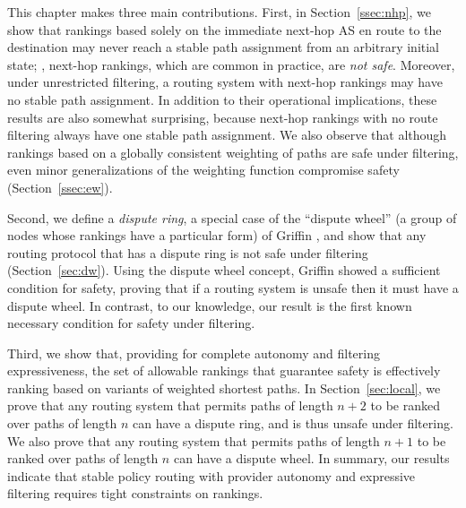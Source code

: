 

This chapter makes three main contributions.  First, in
Section~\ref{ssec:nhp}, we show that rankings based solely on the
immediate next-hop AS en route to the destination may never reach a
stable path assignment from an arbitrary initial state; \ie, next-hop
rankings, which are common in practice, are {\em not safe}.  Moreover,
under unrestricted filtering, a routing system with next-hop rankings
may have no stable path assignment.  In addition to their operational
implications, these results are also somewhat surprising, because
next-hop rankings with no route filtering always have one stable path
assignment.  We also observe that although rankings
based on a globally consistent weighting of paths are safe under
filtering, even minor generalizations of the weighting function
compromise safety (Section~\ref{ssec:ew}).

Second, we define a {\em dispute ring}, a special case of the
``dispute wheel'' (a group of nodes whose rankings have a particular
form) of Griffin
\ea\cite{Griffin2002c}, and show that any routing protocol that has
a dispute ring is not safe under filtering (Section~\ref{sec:dw}).
Using the dispute wheel concept, Griffin \ea showed a sufficient
condition for safety, proving that if a routing system is unsafe then
it must have a dispute wheel.  In contrast, to our knowledge, our
result is the first known necessary condition for safety under
filtering.

Third, we show that, providing for complete autonomy and filtering
expressiveness, the set of allowable rankings that guarantee safety is
effectively ranking based on variants of weighted shortest paths.  In
Section~\ref{sec:local}, we prove that any routing system that permits
paths of length $n+2$ to be ranked over paths of length $n$ can have a
dispute ring, and is thus unsafe under filtering.  We also prove that
any routing system that permits paths of length $n+1$ to be ranked over
paths of length $n$ can have a dispute wheel.  In summary, our results
indicate that stable policy routing with provider autonomy and
expressive filtering requires tight constraints on rankings.

